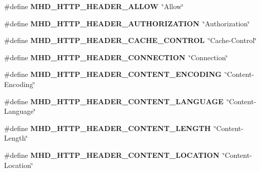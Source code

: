 \begin{DoxyCompactItemize}
\item 
\hypertarget{group__headers_ga1195393b1fad74385137f6cd30497888}{\#define {\bfseries \-M\-H\-D\-\_\-\-H\-T\-T\-P\-\_\-\-H\-E\-A\-D\-E\-R\-\_\-\-A\-L\-L\-O\-W}~\char`\"{}\-Allow\char`\"{}}\label{group__headers_ga1195393b1fad74385137f6cd30497888}

\item 
\hypertarget{group__headers_ga4400070683cba949249129b8ed2f4703}{\#define {\bfseries \-M\-H\-D\-\_\-\-H\-T\-T\-P\-\_\-\-H\-E\-A\-D\-E\-R\-\_\-\-A\-U\-T\-H\-O\-R\-I\-Z\-A\-T\-I\-O\-N}~\char`\"{}\-Authorization\char`\"{}}\label{group__headers_ga4400070683cba949249129b8ed2f4703}

\item 
\hypertarget{group__headers_ga6d2365aa08332b45ad2b16f3e8901b14}{\#define {\bfseries \-M\-H\-D\-\_\-\-H\-T\-T\-P\-\_\-\-H\-E\-A\-D\-E\-R\-\_\-\-C\-A\-C\-H\-E\-\_\-\-C\-O\-N\-T\-R\-O\-L}~\char`\"{}\-Cache-\/\-Control\char`\"{}}\label{group__headers_ga6d2365aa08332b45ad2b16f3e8901b14}

\item 
\hypertarget{group__headers_ga1df2e38bf3a1eeee41b4cbd42673f1f0}{\#define {\bfseries \-M\-H\-D\-\_\-\-H\-T\-T\-P\-\_\-\-H\-E\-A\-D\-E\-R\-\_\-\-C\-O\-N\-N\-E\-C\-T\-I\-O\-N}~\char`\"{}\-Connection\char`\"{}}\label{group__headers_ga1df2e38bf3a1eeee41b4cbd42673f1f0}

\item 
\hypertarget{group__headers_ga80a6d1d7084c40ec5504743ac92c5a78}{\#define {\bfseries \-M\-H\-D\-\_\-\-H\-T\-T\-P\-\_\-\-H\-E\-A\-D\-E\-R\-\_\-\-C\-O\-N\-T\-E\-N\-T\-\_\-\-E\-N\-C\-O\-D\-I\-N\-G}~\char`\"{}\-Content-\/\-Encoding\char`\"{}}\label{group__headers_ga80a6d1d7084c40ec5504743ac92c5a78}

\item 
\hypertarget{group__headers_ga09462e540ca30d38f3f0d562bb2d1fe7}{\#define {\bfseries \-M\-H\-D\-\_\-\-H\-T\-T\-P\-\_\-\-H\-E\-A\-D\-E\-R\-\_\-\-C\-O\-N\-T\-E\-N\-T\-\_\-\-L\-A\-N\-G\-U\-A\-G\-E}~\char`\"{}\-Content-\/\-Language\char`\"{}}\label{group__headers_ga09462e540ca30d38f3f0d562bb2d1fe7}

\item 
\hypertarget{group__headers_ga1c46c8a1850e4b270d4cab0b8515b233}{\#define {\bfseries \-M\-H\-D\-\_\-\-H\-T\-T\-P\-\_\-\-H\-E\-A\-D\-E\-R\-\_\-\-C\-O\-N\-T\-E\-N\-T\-\_\-\-L\-E\-N\-G\-T\-H}~\char`\"{}\-Content-\/\-Length\char`\"{}}\label{group__headers_ga1c46c8a1850e4b270d4cab0b8515b233}

\item 
\hypertarget{group__headers_ga47d2a05b2f8d07a6e4f23eb639c80630}{\#define {\bfseries \-M\-H\-D\-\_\-\-H\-T\-T\-P\-\_\-\-H\-E\-A\-D\-E\-R\-\_\-\-C\-O\-N\-T\-E\-N\-T\-\_\-\-L\-O\-C\-A\-T\-I\-O\-N}~\char`\"{}\-Content-\/\-Location\char`\"{}}\label{group__headers_ga47d2a05b2f8d07a6e4f23eb639c80630}


\end{DoxyCompactItemize}
